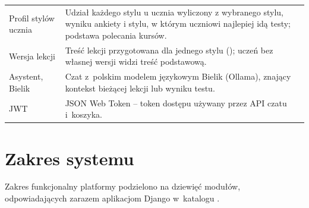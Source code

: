 \begin{table}[H]
\begin{tabularx}{\linewidth}{@{}P{3.6cm}L@{}}
Profil stylów ucznia & Udział każdego stylu u ucznia wyliczony z wybranego stylu, wyniku ankiety i stylu, w którym uczniowi najlepiej idą testy; podstawa polecania kursów. \\
Wersja lekcji & Treść lekcji przygotowana dla jednego stylu (); uczeń bez własnej wersji widzi treść podstawową. \\
Asystent, Bielik & Czat z~polskim modelem językowym Bielik (Ollama), znający kontekst bieżącej lekcji lub wyniku testu. \\
JWT & JSON Web Token -- token dostępu używany przez API czatu i~koszyka. \\
\bottomrule
\end{tabularx}
\end{table}

\section{Zakres systemu}

Zakres funkcjonalny platformy podzielono na dziewięć modułów, odpowiadających zarazem
aplikacjom Django w~katalogu .

